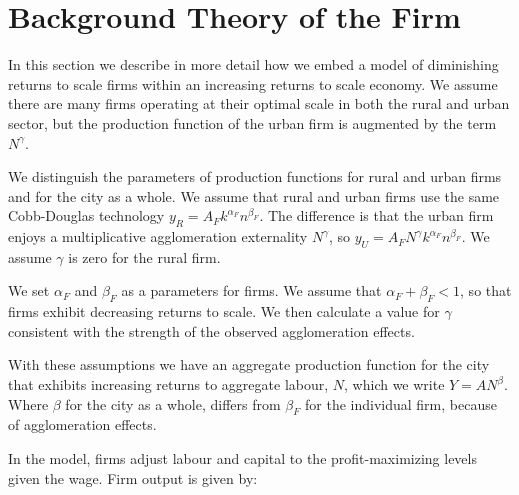\documentclass[]{article}
\begin{document}
 
\section{Background Theory of the Firm} \label{appendix-firm-theory}

{\color{red}


}

In this section we describe in more detail how we embed a model of diminishing returns to scale firms within an increasing returns to scale economy. We assume there are many firms operating at their optimal scale in both the rural and urban sector, but the production function of the urban firm is augmented by the term $N^\gamma$. 


We distinguish the parameters of production functions for rural and urban firms and for the city as a whole. We assume that rural and urban firms use the same Cobb-Douglas technology ${y_R}=A_Fk^{\alpha_F}n^{\beta_F}$. The difference is that the urban firm enjoys a multiplicative agglomeration externality $N^\gamma$, so ${y_U}=A_FN^\gamma  k^{\alpha_F}n^{\beta_F}$. We assume $\gamma$ is zero for the rural firm. 

We set $\alpha_F$ and $\beta_F$ as a parameters for firms. We assume that $\alpha_F+\beta_F<1$, so that firms exhibit decreasing returns to scale.  We then calculate a value for $\gamma$ consistent with the strength of the observed agglomeration effects. 

With these assumptions we have an aggregate production function for the city that exhibits increasing returns to aggregate labour, $N$,  which we write $Y=AN^\beta$. Where $\beta$ for the city as a whole, differs from $\beta_F$ for the individual firm, because of agglomeration effects. 

In the model, firms adjust labour and capital to the profit-maximizing levels given the wage. %
Firm output is given by:
\end{document}

